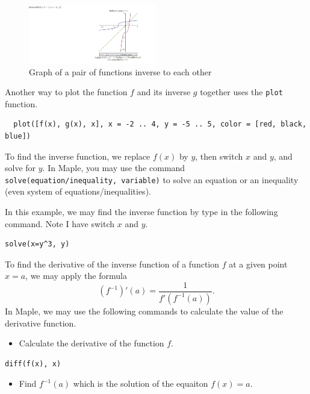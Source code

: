 \documentclass[en,11pt,simple]{elegantbook}
\begin{document}
\begin{figure}
\centering
\includegraphics[width=0.5\textwidth,height=\textheight]{figs/InversePlot1.png}
\caption{Graph of a pair of functions inverse to each other}
\end{figure}

Another way to plot the function \(f\) and its inverse \(g\) together uses the \texttt{plot} function.

\begin{verbatim}
  plot([f(x), g(x), x], x = -2 .. 4, y = -5 .. 5, color = [red, black, blue])
\end{verbatim}

To find the inverse function, we replace \(f(x)\) by \(y\), then switch \(x\) and \(y\), and solve for \(y\). In Maple, you may use the command \texttt{solve(equation/inequality,\ variable)} to solve an equation or an inequality (even system of equations/inequalities).

In this example, we may find the inverse function by type in the following command. Note I have switch \(x\) and \(y\).

\begin{verbatim}
solve(x=y^3, y)
\end{verbatim}

To find the derivative of the inverse function of a function \(f\) at a given point \(x=a\), we may apply the formula
\[(f^{-1})'(a)=\dfrac{1}{f'(f^{-1}(a))}.\]
In Maple, we may use the following commands to calculate the value of the derivative function.

\begin{itemize}

\item
  Calculate the derivative of the function \(f\).
\end{itemize}

\begin{verbatim}
diff(f(x), x)
\end{verbatim}

\begin{itemize}

\item
  Find \(f^{-1}(a)\) which is the solution of the equaiton \(f(x)=a\).
\end{itemize}
\end{document}
